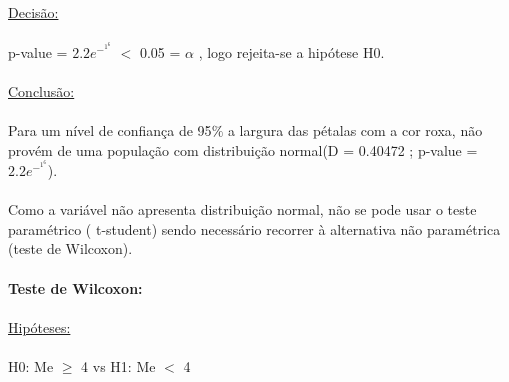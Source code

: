 \documentclass{article}
\begin{document}
\paragraph{} \underline{Decisão:}
\paragraph{} p-value = \begin{math}2.2e^-^1^6\end{math} \begin{math}<\end{math} 0.05 = \begin{math}\alpha\end{math} , logo rejeita-se a hipótese H0.
\paragraph{}\underline{Conclusão:}
\paragraph{}Para um nível de confiança de 95$\%$ a largura das pétalas com a cor roxa, não provém de uma população com distribuição normal(D = 0.40472 ; p-value = \begin{math}2.2e^-^1^6\end{math}).
\paragraph{}Como a variável não apresenta distribuição normal, não se pode usar o teste paramétrico ( t-student) sendo necessário recorrer à alternativa não paramétrica (teste de Wilcoxon).

\paragraph{}

\paragraph{}

\textbf{Teste de Wilcoxon:}
\paragraph{}
\underline{Hipóteses:}
\paragraph{} H0: Me \begin{math}\geq\end{math} 4 vs H1: Me \begin{math}<\end{math} 4
\end{document}
